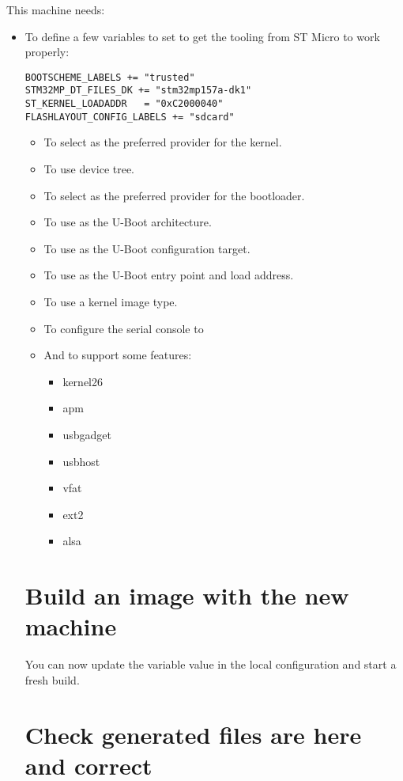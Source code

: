 This  machine needs:

\if{}
\begin{itemize}
  \item To define a few variables to set to get the tooling from ST
    Micro to work properly:
\begin{verbatim}
BOOTSCHEME_LABELS += "trusted"
STM32MP_DT_FILES_DK += "stm32mp157a-dk1"
ST_KERNEL_LOADADDR   = "0xC2000040"
FLASHLAYOUT_CONFIG_LABELS += "sdcard"
\end{verbatim}
\else
\begin{itemize}
  \item To select  as the preferred provider
    for the kernel.
  \item To use  device tree.
  \item To select  as the preferred provider
    for the bootloader.
  \item To use  as the U-Boot architecture.
  \item To use  as the U-Boot
    configuration target.
  \item To use  as the U-Boot entry point and load
    address.
  \item To use a  kernel image type.
  \item To configure the serial console to 
\fi
  \item And to support some features:
    \begin{itemize}
      \item kernel26
      \item apm
      \item usbgadget
      \item usbhost
      \item vfat
      \item ext2
      \item alsa
    \end{itemize}
\end{itemize}
\section{Build an image with the new machine}

You can now update the  variable value in the local configuration
and start a fresh build.

\section{Check generated files are here and correct}


\end{itemize}
